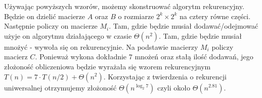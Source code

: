 Używając powyższych wzorów, możemy skonstruować algorytm rekurencyjny.
Będzie on dzielić macierze $A$ oraz $B$ o rozmiarze $2^k \times 2^k$ na cztery równe części.
Następnie policzy on macierze $M_i$.
Tam, gdzie będzie musiał dodawać/odejmować użyje on algorytmu działającego w czasie $\Theta(n^2)$.
Tam, gdzie będzie musiał mnożyć - wywoła się on rekurencyjnie.
Na podstawie macierzy $M_i$ policzy macierz $C$.
Ponieważ wykona dokładnie $7$ mnożeń oraz stałą ilość dodawań, jego złożoność obliczeniowa będzie wyrażała się wzorem rekurencyjnym $T(n) = 7\cdot T(n/2) + \Theta(n^2)$.
Korzystając z twierdzenia o rekurencji uniwersalnej otrzymujemy złożoność $\Theta(n^{\log_2 7})$ czyli około $\Theta(n^{2.81})$.